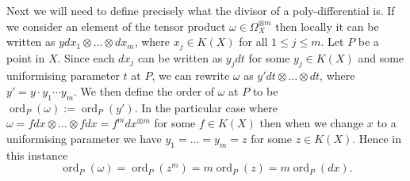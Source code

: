 \documentclass[11pt]{article} %
\theoremstyle{plain}
\theoremstyle{remark}
\newcommand{\cL}{{\mathcal L}}
\DeclareMathOperator{\aut}{Aut}
\DeclareMathOperator{\ord}{ord}
\begin{document}
\begin{comment}
We can define $j\in \aut(X)$ to be the map defined $q_1 \mapsto q_2$ for $q_1, q_2 \in x^{-1}(a)$. 
Obviously this is the identity on the ramification points, and since $x$ is of degree $2$, $j^2$ is the identity map.
We will now use this to show the existence of one more function, $y$, which is necessary to define the basis of $H^0(X,\Omega_X^{\otimes m})$.

If we let $D$ be the divisor $(g+1)p + (g+1)q$ on $k$, then there exists a $y \in \cL(D)$ (unique up to a factor) such that $j^* (y) = -y$.
To start, we have by the Riemann-Roch theorem that $l(D) = \dim\cL(D) = (2g+2)-g+1 = g+3$.
So $\cL(D) \cong k^{g+3}$.
Since $x(p) = x(q) = \infty$ then $j^*$ defines a linear map $\cL(D) \rightarrow \cL(D)$.
Since $j^{*2} = 1$, the eigenvalues must be $\pm 1$, and as such we can decompose $\cL(D)$ in two subspaces, $\cL(D)^+$ and $\cL(D)^-$, corresponding to the eigenspaces of eigenvalues $1$ and $-1$ respectively.
Note that $\cL(D) = \cL(D)^+ \oplus \cL(D)^-$.

If $f\in \cL(D)^+$ then this means that $j^*(f(q))=f(j(q))=f(q)$ for all $q \in X$.
But $x$ maps $q$ and $j(q)$, and only these two points, to the same point in $\mathbb P_k^1$ for all $q\in X$.
So any meromorphic function in $\cL(D)^+$ can be written as a composition of $x$ and a meromorphic function on $\mathbb P_k^1$, such that the composition only has poles at $p$ and $q$ (i.e. the meromorphic function on $\mathbb{P}_k^1$ only has poles at infinity.)
The order of the pole at $p$ or $q$ cannot exceed $g+1$, hence $1,x,\ldots ,x^{g+1}$ forms a basis of $\cL(D)^+$.
As this implies that $\dim\cL(D)^+ = g+2$, and as $\dim\cL(D) = g+3$, we see that $\dim\cL(D)^- = 1$, and so there is a non-trivial meromorphic function $y \in \cL(D)$ such that $j^*(y) = -y$.
This is the $y$ we will use in the following proposition.\\
\end{comment}


Next we will need to define precisely what the divisor of a poly-differential is.
If we consider an element of the tensor product $\omega \in \Omega_X^{\otimes m}$ then locally it can be written as $y dx_1\otimes \ldots \otimes dx_m$, where $x_j \in K(X)$ for all $1 \leq j \leq m$.
Let $P$ be a point in $X$.
Since each $dx_j$ can be written as $y_j dt$ for some $y_j\in K(X)$ and some uniformising parameter $t$ at $P$, we can rewrite $\omega$ as $y' dt \otimes \ldots \otimes dt$, where $y' = y \cdot y_1 \cdots y_m$.
We then define the order of $\omega$ at $P$ to be $\ord_P(\omega ) := \ord_P(y')$.
In the particular case where $\omega = fdx \otimes \ldots \otimes fdx = f^m dx^{\otimes m}$ for some $f\in K(X)$ then when we change $x$ to a uniformising parameter we have $y_1 = \ldots = y_m = z$ for some $z\in K(X)$. 
Hence in this instance \[ \ord_P(\omega) = \ord_P(z^m) = m\ord_P(z) = m\ord_P(dx).\]
\end{document}

